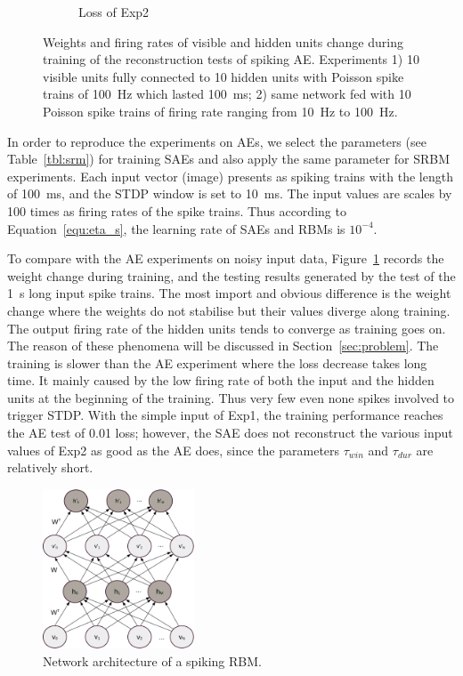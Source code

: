 \begin{figure}
\begin{subfigure}[t]{0.45\textwidth}
		\caption{Loss of Exp2}
	\end{subfigure}
	\caption{Weights and firing rates of visible and hidden units change during training of the reconstruction tests of spiking AE. 
		Experiments 1) 10 visible units fully connected to 10 hidden units with Poisson spike trains of 100~Hz which lasted 100~ms; 2) same network fed with 10 Poisson spike trains of firing rate ranging from 10~Hz to 100~Hz.}
	\label{fig:SAE_orig}
\end{figure}
In order to reproduce the experiments on AEs, we select the parameters (see Table~\ref{tbl:srm}) for training SAEs and also apply the same parameter for SRBM experiments.
Each input vector (image) presents as spiking trains with the length of 100~ms, and the STDP window is set to 10~ms.
The input values are scales by 100 times as firing rates of the spike trains.
Thus according to Equation~\ref{equ:eta_s}, the learning rate of SAEs and RBMs is $10^{-4}$.

To compare with the AE experiments on noisy input data, Figure~\ref{fig:SAE_orig} records the weight change during training, and the testing results generated by the test of the 1~s long input spike trains.
The most import and obvious difference is the weight change where the weights do not stabilise but their values diverge along training.
The output firing rate of the hidden units tends to converge as training goes on.
The reason of these phenomena will be discussed in Section~\ref{sec:problem}.
The training is slower than the AE experiment where the loss decrease takes long time.
It mainly caused by the low firing rate of both the input and the hidden units at the beginning of the training.
Thus very few even none spikes involved to trigger STDP.
With the simple input of Exp1, the training performance reaches the AE test of 0.01 loss;
however, the SAE does not reconstruct the various input values of Exp2 as good as the AE does, since the parameters $\tau_{win}$ and $\tau_{dur}$ are relatively short.

\begin{figure}
	\centering
	\includegraphics[width=0.4\textwidth]{pics_sdlm/rbm.pdf}
	\caption{Network architecture of a spiking RBM.}
	\label{fig:sRBM}
\end{figure}

